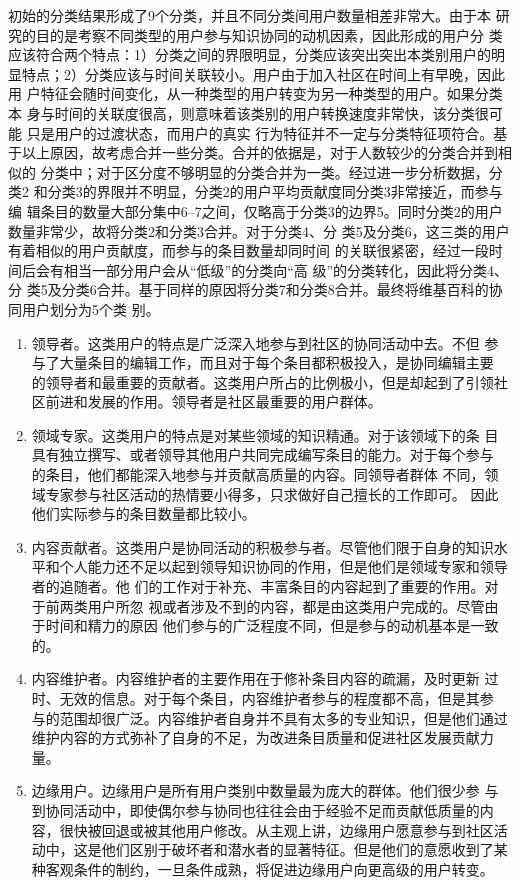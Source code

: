 初始的分类结果形成了9个分类，并且不同分类间用户数量相差非常大。由于本
研究的目的是考察不同类型的用户参与知识协同的动机因素，因此形成的用户分
类应该符合两个特点：1）分类之间的界限明显，分类应该突出突出本类别用户的明
显特点；2）分类应该与时间关联较小。用户由于加入社区在时间上有早晚，因此用
户特征会随时间变化，从一种类型的用户转变为另一种类型的用户。如果分类本
身与时间的关联度很高，则意味着该类别的用户转换速度非常快，该分类很可能
只是用户的过渡状态，而用户的真实
行为特征并不一定与分类特征项符合。基于以上原因，故考虑合并一些分类。合并的依据是，对于人数较少的分类合并到相似的
分类中；对于区分度不够明显的分类合并为一类。经过进一步分析数据，分类2
和分类3的界限并不明显，分类2的用户平均贡献度同分类3非常接近，而参与编
辑条目的数量大部分集中6--7之间，仅略高于分类3的边界5。同时分类2的用户
数量非常少，故将分类2和分类3合并。对于分类4、分
类5及分类6，这三类的用户有着相似的用户贡献度，而参与的条目数量却同时间
的关联很紧密，经过一段时间后会有相当一部分用户会从“低级”的分类向“高
级”的分类转化，因此将分类4、分
类5及分类6合并。基于同样的原因将分类7和分类8合并。最终将维基百科的协同用户划分为5个类
别。
\begin{enumerate}
\item 领导者。这类用户的特点是广泛深入地参与到社区的协同活动中去。不但
  参与了大量条目的编辑工作，而且对于每个条目都积极投入，是协同编辑主要
  的领导者和最重要的贡献者。这类用户所占的比例极小，但是却起到了引领社
  区前进和发展的作用。领导者是社区最重要的用户群体。
\item 领域专家。这类用户的特点是对某些领域的知识精通。对于该领域下的条
  目具有独立撰写、或者领导其他用户共同完成编写条目的能力。对于每个参与
  的条目，他们都能深入地参与并贡献高质量的内容。同领导者群体
  不同，领域专家参与社区活动的热情要小得多，只求做好自己擅长的工作即可。
  因此他们实际参与的条目数量都比较小。
\item 内容贡献者。这类用户是协同活动的积极参与者。尽管他们限于自身的知识水
  平和个人能力还不足以起到领导知识协同的作用，但是他们是领域专家和领导者的追随者。他
  们的工作对于补充、丰富条目的内容起到了重要的作用。对于前两类用户所忽
  视或者涉及不到的内容，都是由这类用户完成的。尽管由于时间和精力的原因
  他们参与的广泛程度不同，但是参与的动机基本是一致的。
\item 内容维护者。内容维护者的主要作用在于修补条目内容的疏漏，及时更新
  过时、无效的信息。对于每个条目，内容维护者参与的程度都不高，但是其参
  与的范围却很广泛。内容维护者自身并不具有太多的专业知识，但是他们通过
  维护内容的方式弥补了自身的不足，为改进条目质量和促进社区发展贡献力量。
\item 边缘用户。边缘用户是所有用户类别中数量最为庞大的群体。他们很少参
  与到协同活动中，即使偶尔参与协同也往往会由于经验不足而贡献低质量的内
  容，很快被回退或被其他用户修改。从主观上讲，边缘用户愿意参与到社区活
  动中，这是他们区别于破坏者和潜水者的显著特征。但是他们的意愿收到了某
  种客观条件的制约，一旦条件成熟，将促进边缘用户向更高级的用户转变。
\end{enumerate}

